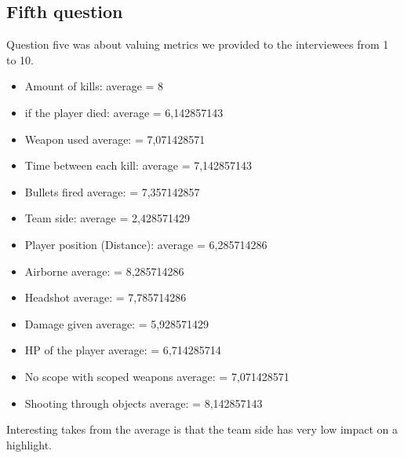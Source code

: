 \documentclass[a4paper,twoside]{bth}
\begin{document}
\subsection{Fifth question}
Question five was about valuing metrics we provided to the interviewees from 1 to 10.
        \begin{itemize}
        \item Amount of kills: average = 8
        \item if the player died: average = 6,142857143
        \item Weapon used average: = 7,071428571
        \item Time between each kill: average = 7,142857143
        \item Bullets fired average: = 7,357142857
        \item Team side: average = 2,428571429
        \item Player position (Distance): average = 6,285714286
        \item Airborne average: = 8,285714286
        \item Headshot average: = 7,785714286
        \item Damage given average: = 5,928571429
        \item HP of the player average: = 6,714285714
        \item No scope with scoped weapons average: = 7,071428571
        \item Shooting through objects average: = 8,142857143
    \end{itemize}
Interesting takes from the average is that the team side has very low impact on a highlight.\\\\
\end{document}
